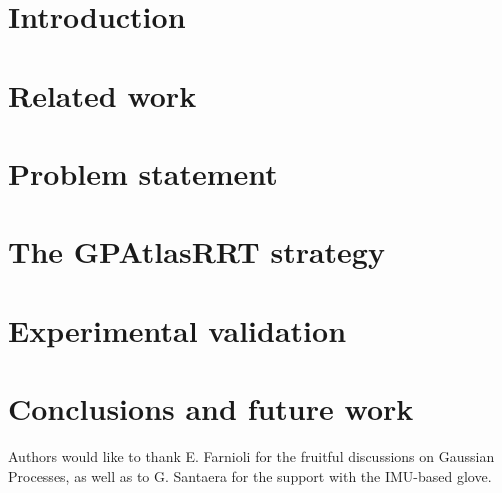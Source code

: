 \section{Introduction}
\label{sec:intro}



\section{Related work}
\label{sec:related}



\section{Problem statement}
\label{sec:scope}



\section{The GPAtlasRRT strategy}
\label{sec:solution}



\section{Experimental validation}
\label{sec:experiments}



\section{Conclusions and future work}
\label{sec:conclusions}



\begin{acknowledgements}
Authors would like to thank E. Farnioli for the fruitful discussions on Gaussian Processes, as well as to G. Santaera for the support with the IMU-based glove.
\end{acknowledgements}


